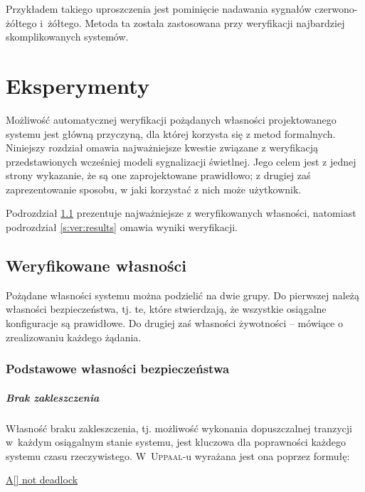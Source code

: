 \documentclass{pracamgr}
\newcommand{\upp}{\textsc{Uppaal}}
\theoremstyle{plain}
\begin{document}
Przykładem takiego uproszczenia jest pominięcie nadawania sygnałów
czerwono-żółtego i~żółtego. Metoda ta została zastosowana przy
weryfikacji najbardziej skomplikowanych systemów.

\chapter{Eksperymenty}
\label{c:ver}
Możliwość automatycznej weryfikacji pożądanych własności
projektowanego systemu jest główną przyczyną, dla której korzysta się
z metod formalnych. Niniejszy rozdział omawia najważniejsze kwestie
związane z weryfikacją przedstawionych wcześniej modeli sygnalizacji
świetlnej. Jego celem jest z jednej strony wykazanie, że są one
zaprojektowane prawidłowo; z drugiej zaś zaprezentowanie sposobu, w
jaki korzystać z nich może użytkownik.

Podrozdział \ref{s:ver:properties} prezentuje najważniejsze z
weryfikowanych własności, natomiast podrozdział \ref{s:ver:results}
omawia wyniki weryfikacji.

\section{Weryfikowane własności}
\label{s:ver:properties}

Pożądane własności systemu można podzielić na dwie grupy. Do pierwszej
należą własności bezpieczeństwa, tj. te, które stwierdzają, że
wszystkie osiągalne konfiguracje są prawidłowe. Do drugiej zaś
własności żywotności -- mówiące o zrealizowaniu każdego żądania.

\subsection{Podstawowe własności bezpieczeństwa}
\label{s:ver:properties:safety}

\paragraph{Brak zakleszczenia} Własność braku zakleszczenia,
tj. możliwość wykonania dopuszczalnej tranzycji w~każdym osiągalnym
stanie systemu, jest kluczowa dla poprawności każdego systemu czasu
rzeczywistego. W~\upp-u wyrażana jest ona poprzez formułę:
\begin{center}
  \url{A[] not deadlock}
\end{center}
\end{document}

